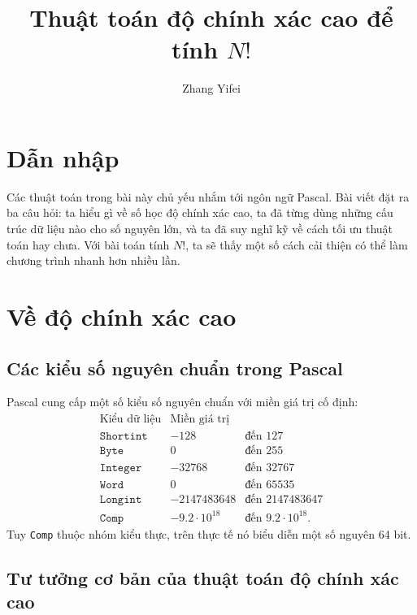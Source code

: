\documentclass[11pt]{article}
\title{Thuật toán độ chính xác cao để tính \(N!\)}
\author{Zhang Yifei}
\date{}
\begin{document}
\maketitle


\tableofcontents

\section{Dẫn nhập}

Các thuật toán trong bài này chủ yếu nhắm tới ngôn ngữ Pascal. Bài viết đặt
ra ba câu hỏi: ta hiểu gì về số học độ chính xác cao, ta đã từng dùng những
cấu trúc dữ liệu nào cho số nguyên lớn, và ta đã suy nghĩ kỹ về cách tối ưu
thuật toán hay chưa. Với bài toán tính \(N!\), ta sẽ thấy một số cách cải
thiện có thể làm chương trình nhanh hơn nhiều lần.

\section{Về độ chính xác cao}

\subsection{Các kiểu số nguyên chuẩn trong Pascal}

Pascal cung cấp một số kiểu số nguyên chuẩn với miền giá trị cố định:
\[
\begin{array}{lll}
\text{Kiểu dữ liệu} & \text{Miền giá trị} \\
\hline
\texttt{Shortint} & -128 & \text{đến }127 \\
\texttt{Byte}     & 0    & \text{đến }255 \\
\texttt{Integer}  & -32768 & \text{đến }32767 \\
\texttt{Word}     & 0 & \text{đến }65535 \\
\texttt{Longint}  & -2147483648 & \text{đến }2147483647 \\
\texttt{Comp}     & -9.2\cdot 10^{18} & \text{đến }9.2\cdot 10^{18}.
\end{array}
\]
Tuy \texttt{Comp} thuộc nhóm kiểu thực, trên thực tế nó biểu diễn một số
nguyên 64 bit.

\subsection{Tư tưởng cơ bản của thuật toán độ chính xác cao}
\end{document}
